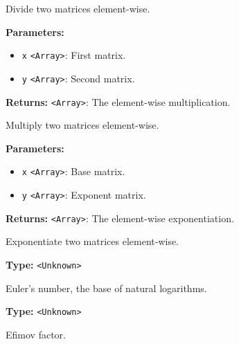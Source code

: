 \documentclass[12pt,a4paper]{article}
\begin{document}
\noindent Divide two matrices element-wise.

\vspace{5mm}
\noindent {}


\noindent \textbf{Parameters:}
\begin{itemize}
  \item \texttt{x} \texttt{<Array>}: First matrix.
  \item \texttt{y} \texttt{<Array>}: Second matrix.
\end{itemize}

\noindent \textbf{Returns:} \texttt{<Array>}: The element-wise multiplication.

\noindent Multiply two matrices element-wise.

\vspace{5mm}
\noindent {}


\noindent \textbf{Parameters:}
\begin{itemize}
  \item \texttt{x} \texttt{<Array>}: Base matrix.
  \item \texttt{y} \texttt{<Array>}: Exponent matrix.
\end{itemize}

\noindent \textbf{Returns:} \texttt{<Array>}: The element-wise exponentiation.

\noindent Exponentiate two matrices element-wise.

\vspace{5mm}
\noindent {}\vspace{4mm}


\noindent \textbf{Type:} \texttt{<Unknown>}

\noindent Euler's number, the base of natural logarithms.

\vspace{5mm}
\noindent {}\vspace{4mm}


\noindent \textbf{Type:} \texttt{<Unknown>}

\noindent Efimov factor.
\end{document}
